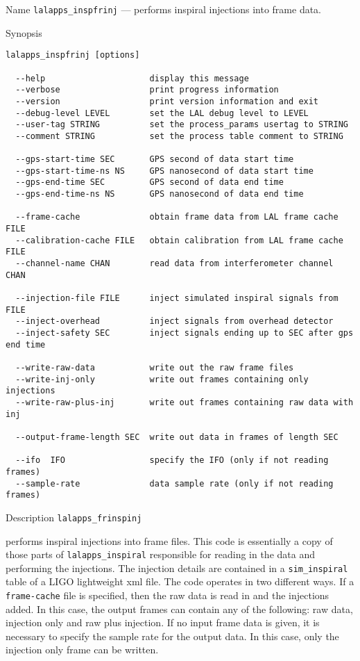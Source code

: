 \begin{entry}
\item[Name]
\verb$lalapps_inspfrinj$ --- performs inspiral injections into frame data.

\item[Synopsis]
\begin{verbatim}
lalapps_inspfrinj [options]
 
  --help                     display this message
  --verbose                  print progress information
  --version                  print version information and exit
  --debug-level LEVEL        set the LAL debug level to LEVEL
  --user-tag STRING          set the process_params usertag to STRING
  --comment STRING           set the process table comment to STRING
 
  --gps-start-time SEC       GPS second of data start time
  --gps-start-time-ns NS     GPS nanosecond of data start time
  --gps-end-time SEC         GPS second of data end time
  --gps-end-time-ns NS       GPS nanosecond of data end time
 
  --frame-cache              obtain frame data from LAL frame cache FILE
  --calibration-cache FILE   obtain calibration from LAL frame cache FILE
  --channel-name CHAN        read data from interferometer channel CHAN
 
  --injection-file FILE      inject simulated inspiral signals from FILE
  --inject-overhead          inject signals from overhead detector
  --inject-safety SEC        inject signals ending up to SEC after gps end time
 
  --write-raw-data           write out the raw frame files
  --write-inj-only           write out frames containing only injections
  --write-raw-plus-inj       write out frames containing raw data with inj
 
  --output-frame-length SEC  write out data in frames of length SEC
 
  --ifo  IFO                 specify the IFO (only if not reading frames)
  --sample-rate              data sample rate (only if not reading frames)
\end{verbatim}

\item[Description] 
\verb$lalapps_frinspinj$

performs inspiral injections into frame files.  This code is essentially
a copy of those parts of \verb$lalapps_inspiral$ responsible for reading
in the data and performing the injections.  The injection details
are contained in a \verb$sim_inspiral$ table of a LIGO lightweight xml
file.  The code operates in two different ways.  If a \verb$frame-cache$
file is specified, then the raw data is read in and the injections
added.  In this case, the output frames can contain any of the
following: raw data, injection only and raw plus injection.  If no input
frame data is given, it is necessary to specify the sample rate for the
output data.  In this case, only the injection only frame can be
written.


\end{entry}
